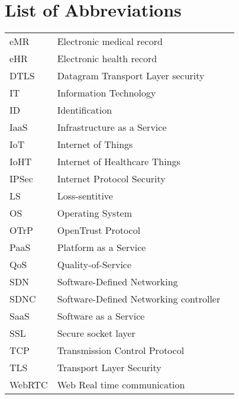 \section*{List of Abbreviations}
\begin{table}[ht]
\begin{tabular}{lll}
eMR & Electronic medical record \\
eHR & Electronic health record \\
DTLS & Datagram Transport Layer security \\
IT & Information Technology \\
ID & Identification \\
IaaS & Infrastructure as a Service \\
IoT & Internet of Things \\
IoHT & Internet of Healthcare Things \\
IPSec & Internet Protocol Security \\
LS & Loss-sentitive \\
OS & Operating System \\
OTrP & OpenTrust Protocol \\
PaaS & Platform as a Service \\
QoS & Quality-of-Service \\
SDN & Software-Defined Networking \\
SDNC & Software-Defined Networking controller \\
SaaS & Software as a Service \\
SSL & Secure socket layer \\
TCP & Transmission Control Protocol \\
TLS & Transport Layer Security \\
WebRTC & Web Real time communication \\
\end{tabular}
\end{table}